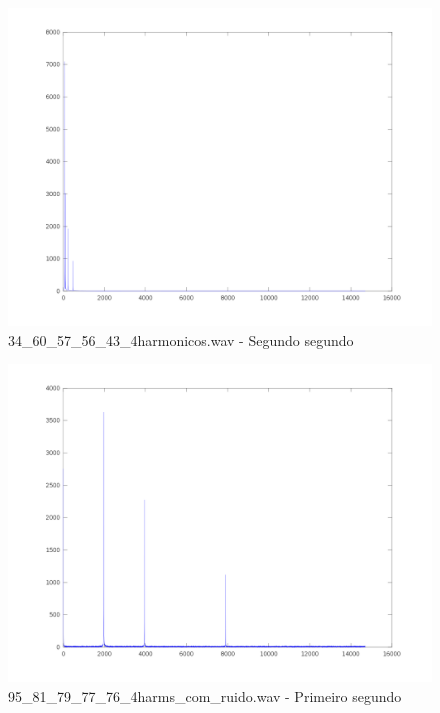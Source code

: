 \documentclass[brazil,times]{abnt}
\begin{document}
			\begin{figure}[h!]
			\begin{center}
			  \includegraphics[width=150mm]{imagens/34_60_57_56_43_4harmonicos_freq_seg_2.png}
			  \caption[34\_60\_57\_56\_43\_4harmonicos.wav - Segundo segundo]{34\_60\_57\_56\_43\_4harmonicos.wav - Segundo segundo}
			\end{center}
			\end{figure}

			\begin{figure}[h!]
			\begin{center}
			  \includegraphics[width=150mm]{imagens/95_81_79_77_76_4harms_com_ruido_freq_seg_1.png}
			  \caption[95\_81\_79\_77\_76\_4harms\_com\_ruido.wav - Primeiro segundo]{95\_81\_79\_77\_76\_4harms\_com\_ruido.wav - Primeiro segundo}
			\end{center}
			\end{figure}
\end{document}
